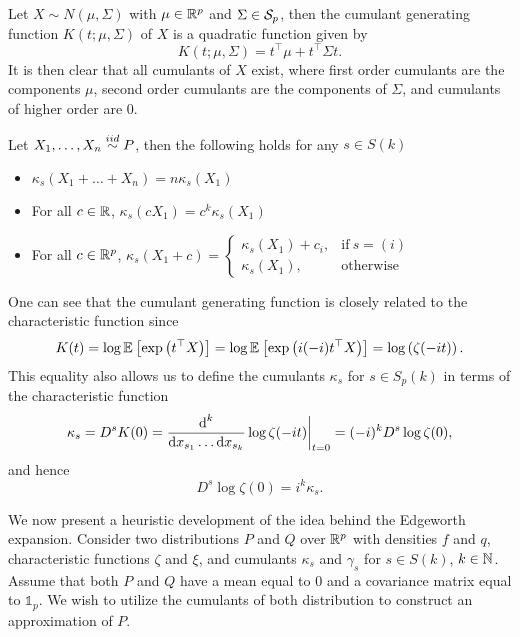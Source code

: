 \begin{example} \label{ex-cumulants-mvn}
    Let $X \sim N(\mu, \Sigma)$ with $\mu \in {\mathbb{R}^p}$ and $\Sigma \in {\mathcal{S}_p}$, then the cumulant generating function $K(t; \mu, \Sigma)$ of $X$ is a quadratic function given by
    \begin{equation*}
        K(t; \mu, \Sigma) = t^\top\mu + t^\top\Sigma t.
    \end{equation*}
    It is then clear that all cumulants of $X$ exist, where first order cumulants are the components $\mu$, second order cumulants are the components of $\Sigma$, and cumulants of higher order are 0.
\end{example}

\begin{lemma} \label{lem-cumulants-props}
    Let $X_1, \ldots, X_n \stackrel{iid}{\sim} P$, then the following holds for any $s \in S(k)$
    \begin{itemize}
        \item {
        $\kappa_s(X_1 + \ldots + X_n) = n\kappa_s(X_1)$
        }
        \item {
            For all $c \in \mathbb{R}$, $\kappa_s(c X_1) = c^k\kappa_s(X_1)$
        }
        \item {
            For all $c \in {\mathbb{R}^p}$, $\kappa_s(X_1 + c) =
            \begin{cases}
                \kappa_s(X_1) + c_i, &\text{if}\ s=(i)\\
                \kappa_s(X_1),& \text{otherwise}
            \end{cases}$
        }
    \end{itemize}
\end{lemma}

\begin{remark}
    One can see that the cumulant generating function is closely related to the characteristic function since
    \begin{equation*}
        K(t) 
        = \log \mathbb{E}_{}\left[\exp\left(t^\top X\right)\right] 
        = \log \mathbb{E}_{}\left[\exp\left(i (-i)t^\top X\right)\right]
        = \log\left(\zeta(-it)\right).
    \end{equation*}
    This equality also allows us to define the cumulants $\kappa_s$ for $s \in S_p(k)$ in terms of the characteristic function
    \begin{equation*}
        \kappa_s = D^s K(0) 
        = \frac{\text{d}^k}{\text{d} x_{s_1} \ldots \text{d} x_{s_k}} \log \zeta(-it) \bigg|_{t=0}
        = (-i)^{k} D^s \log \zeta(0),
    \end{equation*}
    and hence
    \begin{equation*}
        D^s \log \zeta(0) = i^k \kappa_s.
    \end{equation*}
\end{remark}
We now present a heuristic development of the idea behind the Edgeworth expansion. Consider two distributions $P$ and $Q$ over ${\mathbb{R}^p}$ with densities $f$ and $q$, characteristic functions $\zeta$ and $\xi$, and cumulants $\kappa_s$ and $\gamma_s$ for $s \in S(k)$, $k \in \mathbb{N}$. Assume that both $P$ and $Q$ have a mean equal to $0$ and a covariance matrix equal to $\mathbb{1}_p$. We wish to utilize the cumulants of both distribution to construct an approximation of $P$.

